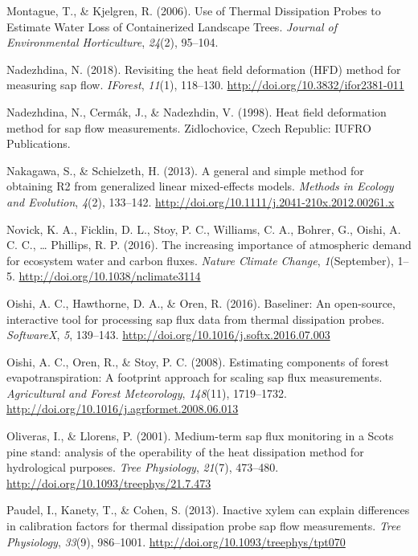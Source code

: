\documentclass[11pt,twoside]{reedthesis}
\begin{document}
\hypertarget{ref-Montague2006}{}
Montague, T., \& Kjelgren, R. (2006). Use of Thermal Dissipation Probes
to Estimate Water Loss of Containerized Landscape Trees. \emph{Journal
of Environmental Horticulture}, \emph{24}(2), 95--104.

\hypertarget{ref-Nadezhdina2018}{}
Nadezhdina, N. (2018). Revisiting the heat field deformation (HFD)
method for measuring sap flow. \emph{IForest}, \emph{11}(1), 118--130.
\url{http://doi.org/10.3832/ifor2381-011}

\hypertarget{ref-Nadezhdina1998}{}
Nadezhdina, N., Cermák, J., \& Nadezhdin, V. (1998). Heat field
deformation method for sap flow measurements. Zidlochovice, Czech
Republic: IUFRO Publications.

\hypertarget{ref-Nakagawa2013}{}
Nakagawa, S., \& Schielzeth, H. (2013). A general and simple method for
obtaining R2 from generalized linear mixed-effects models. \emph{Methods
in Ecology and Evolution}, \emph{4}(2), 133--142.
\url{http://doi.org/10.1111/j.2041-210x.2012.00261.x}

\hypertarget{ref-Novick2016}{}
Novick, K. A., Ficklin, D. L., Stoy, P. C., Williams, C. A., Bohrer, G.,
Oishi, A. C. C., \ldots{} Phillips, R. P. (2016). The increasing
importance of atmospheric demand for ecosystem water and carbon fluxes.
\emph{Nature Climate Change}, \emph{1}(September), 1--5.
\url{http://doi.org/10.1038/nclimate3114}

\hypertarget{ref-Oishi2016}{}
Oishi, A. C., Hawthorne, D. A., \& Oren, R. (2016). Baseliner: An
open-source, interactive tool for processing sap flux data from thermal
dissipation probes. \emph{SoftwareX}, \emph{5}, 139--143.
\url{http://doi.org/10.1016/j.softx.2016.07.003}

\hypertarget{ref-Oishi2008}{}
Oishi, A. C., Oren, R., \& Stoy, P. C. (2008). Estimating components of
forest evapotranspiration: A footprint approach for scaling sap flux
measurements. \emph{Agricultural and Forest Meteorology},
\emph{148}(11), 1719--1732.
\url{http://doi.org/10.1016/j.agrformet.2008.06.013}

\hypertarget{ref-Oliveras2001}{}
Oliveras, I., \& Llorens, P. (2001). Medium-term sap flux monitoring in
a Scots pine stand: analysis of the operability of the heat dissipation
method for hydrological purposes. \emph{Tree Physiology}, \emph{21}(7),
473--480. \url{http://doi.org/10.1093/treephys/21.7.473}

\hypertarget{ref-Paudel2013}{}
Paudel, I., Kanety, T., \& Cohen, S. (2013). Inactive xylem can explain
differences in calibration factors for thermal dissipation probe sap
flow measurements. \emph{Tree Physiology}, \emph{33}(9), 986--1001.
\url{http://doi.org/10.1093/treephys/tpt070}
\end{document}
